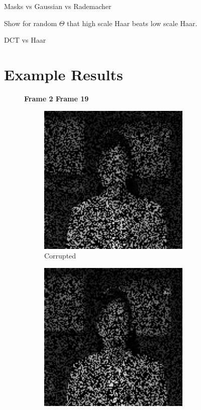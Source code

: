 Masks vs Gaussian vs Rademacher

Show for random $\Theta$ that high scale Haar beats low scale Haar. 

DCT vs Haar 



\clearpage

\section{Example Results}

\begin{figure}[!ht]
  \centering
  \textbf{\hspace{0.2in} Frame 2 \hspace{1.5in} Frame 19\hspace{0.5in}\vspace{0.2in}}
  \begin{subfigure}{0.4\textwidth}
    \centering
    \includegraphics[width=0.8\textwidth]{Chapter7/Images/akiyo40_masked_2.png}
    \caption{Corrupted}
  \end{subfigure}
  \begin{subfigure}{0.4\textwidth}
    \centering
    \includegraphics[width=0.8\textwidth]{Chapter7/Images/akiyo40_masked_19.png}

\end{subfigure}
\end{figure}
